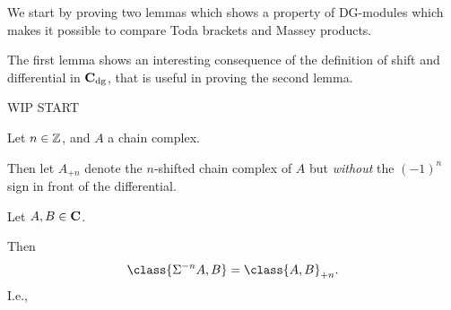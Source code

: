 We start by proving two lemmas which shows a property of DG-modules which makes it possible to compare Toda brackets and Massey products.

The first lemma shows an interesting consequence of the definition of shift and differential in \( \operatorname{\mathbf{C}}_{\operatorname{dg}} \), that is useful in proving the second lemma.

WIP START

\begin{notation}
    Let \( n \in {\mathbb{Z}} \), and \( A \) a chain complex.
    
    Then let \( A_{+n} \) denote the \( n \)-shifted chain complex of \( A \) but \emph{without} the \( (-1)^n \) sign in front of the differential.
\end{notation}

\begin{lemma}
    \label{lem:shift_one_component_inner_product_chain_complex}
    Let \( A, B \in \operatorname{\mathbf{C}} \).

    Then
    \[
        \class{\Sigma^{-n} A, B} = \class{A, B}_{+n}.
    \]
    I.e.,
    \begin{center}
    \end{center}
\end{lemma}
